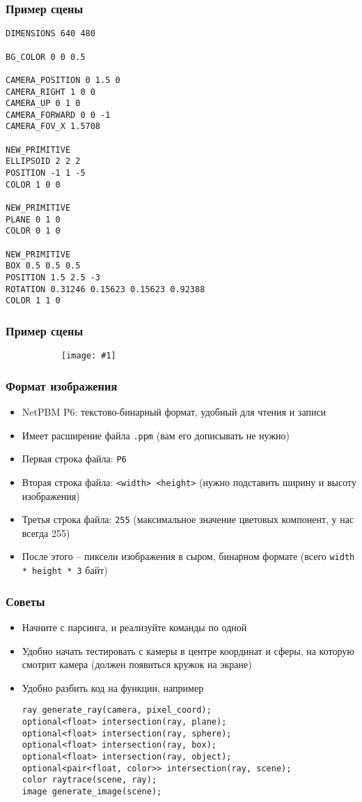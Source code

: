 \documentclass[10pt,handout]{beamer}
\newcommand{\slideimage}[1]{
  \begin{figure}
    \begin{adjustbox}{width=\textwidth, totalheight=\textheight-2\baselineskip-2\baselineskip,keepaspectratio}
      \texttt{[image: \#1]}
    \end{adjustbox}
  \end{figure}
}
\begin{document}
\begin{frame}[fragile]
\frametitle{Пример сцены}
\begin{verbatim}
DIMENSIONS 640 480

BG_COLOR 0 0 0.5

CAMERA_POSITION 0 1.5 0
CAMERA_RIGHT 1 0 0
CAMERA_UP 0 1 0
CAMERA_FORWARD 0 0 -1
CAMERA_FOV_X 1.5708

NEW_PRIMITIVE
ELLIPSOID 2 2 2
POSITION -1 1 -5
COLOR 1 0 0

NEW_PRIMITIVE
PLANE 0 1 0
COLOR 0 1 0

NEW_PRIMITIVE
BOX 0.5 0.5 0.5
POSITION 1.5 2.5 -3
ROTATION 0.31246 0.15623 0.15623 0.92388
COLOR 1 1 0
\end{verbatim}
\end{frame}

\begin{frame}
\frametitle{Пример сцены}
\begin{figure}
\slideimage{result.png}
\end{figure}
\end{frame}

\begin{frame}
\frametitle{Формат изображения}
\begin{itemize}
\item NetPBM P6: текстово-бинарный формат, удобный для чтения и записи
\pause
\item Имеет расширение файла \texttt{.ppm} (вам его дописывать не нужно)
\pause
\item Первая строка файла: \texttt{P6}
\item Вторая строка файла: \texttt{<width> <height>} (нужно подставить ширину и высоту изображения)
\item Третья строка файла: \texttt{255} (максимальное значение цветовых компонент, у нас всегда 255)
\item После этого -- пиксели изображения в сыром, бинарном формате (всего \texttt{width * height * 3} байт)
\end{itemize}
\end{frame}

\begin{frame}[fragile]
\frametitle{Советы}
\begin{itemize}
\item Начните с парсинга, и реализуйте команды по одной
\pause
\item Удобно начать тестировать с камеры в центре координат и сферы, на которую смотрит камера (должен появиться кружок на экране)
\pause
\item Удобно разбить код на функции, например
\begin{verbatim}
ray generate_ray(camera, pixel_coord);
optional<float> intersection(ray, plane);
optional<float> intersection(ray, sphere);
optional<float> intersection(ray, box);
optional<float> intersection(ray, object);
optional<pair<float, color>> intersection(ray, scene);
color raytrace(scene, ray);
image generate_image(scene);
\end{verbatim}
\end{itemize}
\end{frame}
\end{document}
